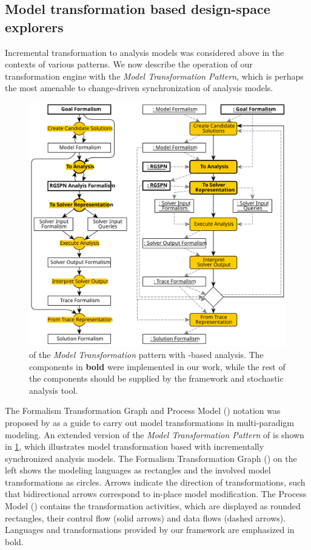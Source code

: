 \subsection{Model transformation based design-space explorers}

Incremental transformation to  analysis models was considered above in the contexts of various  patterns. We now describe the operation of our transformation engine with the \emph{Model Transformation Pattern}, which is perhaps the most amenable to change-driven synchronization of analysis models.

\begin{figure}
  \centering
  \includegraphics[scale=0.9]{figures/dse_ftg_pm}
  \caption{ of the \emph{Model Transformation}  pattern with -based analysis. The components in \textbf{bold} were implemented in our work, while the rest of the components should be supplied by the  framework and stochastic analysis tool.}
  \label{fig:apply:ftg-pm}
\end{figure}

The Formalism Transformation Graph and Process Model () notation was proposed by \citet{Lucio12ftgpm} as a guide to carry out model transformations in multi-paradigm modeling. An  extended version of the \emph{Model Transformation Pattern}  of \citet[Figure~4]{Vanherpen14patterns} is shown in \cref{fig:apply:ftg-pm}, which illustrates model transformation based  with incrementally synchronized  analysis models. The Formalism Transformation Graph () on the left shows the modeling languages as rectangles and the involved model transformations as circles. Arrows indicate the direction of transformations, such that bidirectional arrows correspond to in-place model modification. The Process Model () contains the transformation activities, which are displayed as rounded rectangles, their control flow (solid arrows) and data flows (dashed arrows). Languages and transformations provided by our framework are emphasized in bold.

